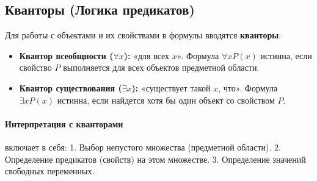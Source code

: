 \subsection*{Кванторы (Логика предикатов)}

Для работы с объектами и их свойствами в формулы вводятся \textbf{кванторы}:
\begin{itemize}
    \item \textbf{Квантор всеобщности ($\forall x$):} «для всех $x$». Формула $\forall x P(x)$ истинна, если свойство $P$ выполняется для всех объектов предметной области.
    \item \textbf{Квантор существования ($\exists x$):} «существует такой $x$, что». Формула $\exists x P(x)$ истинна, если найдется хотя бы один объект со свойством $P$.
\end{itemize}
\paragraph{Интерпретация с кванторами} включает в себя:
1. Выбор непустого множества (предметной области).
2. Определение предикатов (свойств) на этом множестве.
3. Определение значений свободных переменных.